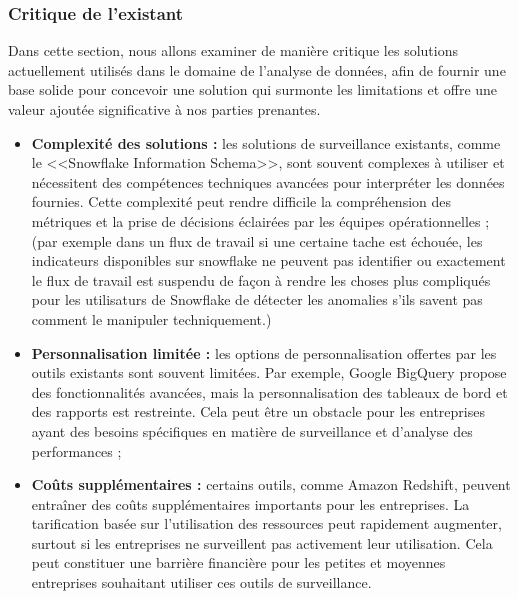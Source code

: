 \subsubsection{Critique de l'existant}
\par Dans cette section, nous allons examiner de manière critique les solutions actuellement utilisés dans le domaine de l'analyse de données, afin de fournir une base solide pour concevoir une solution qui surmonte les limitations et offre une valeur ajoutée significative à nos parties prenantes.
\begin{itemize}
    \item\textbf{Complexité des solutions : }les solutions de surveillance existants, comme le <<Snowflake Information Schema>>, sont souvent complexes à utiliser et nécessitent des compétences techniques avancées pour interpréter les données fournies. 
    Cette complexité peut rendre difficile la compréhension des métriques et la prise de décisions éclairées par les équipes opérationnelles ;
    (par exemple dans un flux de travail si une certaine tache est échouée, les indicateurs disponibles sur snowflake ne peuvent pas identifier ou exactement le flux de travail est suspendu de façon à rendre les choses plus compliqués pour les utilisaturs de Snowflake de détecter les anomalies s'ils savent pas comment le manipuler techniquement.)

    \item\textbf{Personnalisation limitée : }les options de personnalisation offertes par les outils existants sont souvent limitées. 
    Par exemple, Google BigQuery propose des fonctionnalités avancées, mais la personnalisation des tableaux de bord et des rapports est restreinte. Cela peut être un obstacle pour les entreprises ayant des besoins spécifiques en matière de surveillance et d'analyse des performances ;

    \item\textbf{Coûts supplémentaires : }certains outils, comme Amazon Redshift, peuvent entraîner des coûts supplémentaires importants pour les entreprises. La tarification basée sur l'utilisation des ressources peut rapidement augmenter, surtout si les entreprises ne surveillent pas activement leur utilisation. 
    Cela peut constituer une barrière financière pour les petites et moyennes entreprises souhaitant utiliser ces outils de surveillance.

\end{itemize}

